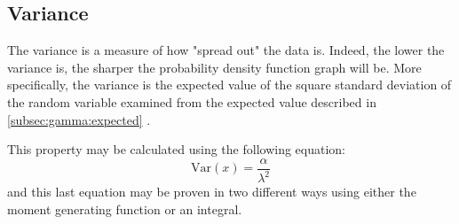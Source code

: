 \documentclass[12pt]{article}
\begin{document}

\pagebreak
\subsection{Variance}
The variance is a measure of how "spread out" the data is. Indeed, the lower the variance is, the sharper the
probability density function graph will be. More specifically, the variance is the expected value of the square standard
deviation of the random variable examined from the expected value described in
\autoref{subsec:gamma:expected}\cite{wikipediaVariance2022} .

This property may be calculated using the following equation:
\begin{equation}\label{eq:gamma:var}
	\text{Var}(x) = \frac{\alpha}{\lambda^2}
\end{equation}
and this last equation may be proven in two different ways using either the moment generating function or an integral.
\end{document}
